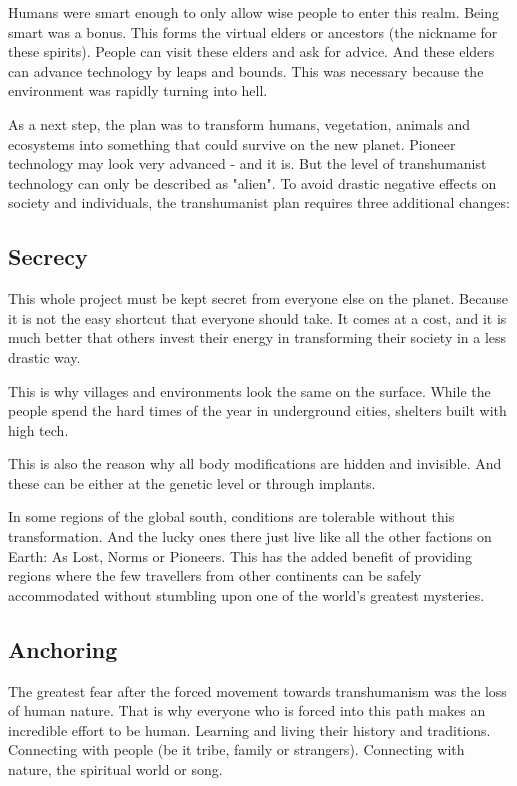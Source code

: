 Humans were smart enough to only allow wise people to enter this realm. Being smart was a bonus. This forms the virtual elders or ancestors (the nickname for these spirits). People can visit these elders and ask for advice.
And these elders can advance technology by leaps and bounds. This was necessary because the environment was rapidly turning into hell.

As a next step, the plan was to transform humans, vegetation, animals and ecosystems into something that could survive on the new planet. Pioneer technology may look very advanced - and it is. But the level of transhumanist technology can only be described as "alien". To avoid drastic negative effects on society and individuals, the transhumanist plan requires three additional changes:

\subsection{Secrecy}

This whole project must be kept secret from everyone else on the planet. Because it is not the easy shortcut that everyone should take. It comes at a cost, and it is much better that others invest their energy in transforming their society in a less drastic way.

This is why villages and environments look the same on the surface. While the people spend the hard times of the year in underground cities, shelters built with high tech.

This is also the reason why all body modifications are hidden and invisible. And these can be either at the genetic level or through implants.

In some regions of the global south, conditions are tolerable without this transformation. And the lucky ones there just live like all the other factions on Earth: As Lost, Norms or Pioneers. This has the added benefit of providing regions where the few travellers from other continents can be safely accommodated without stumbling upon one of the world's greatest mysteries.

\subsection{Anchoring}

The greatest fear after the forced movement towards transhumanism was the loss of human nature.
That is why everyone who is forced into this path makes an incredible effort to be human. Learning and living their history and traditions. Connecting with people (be it tribe, family or strangers). Connecting with nature, the spiritual world or song.

